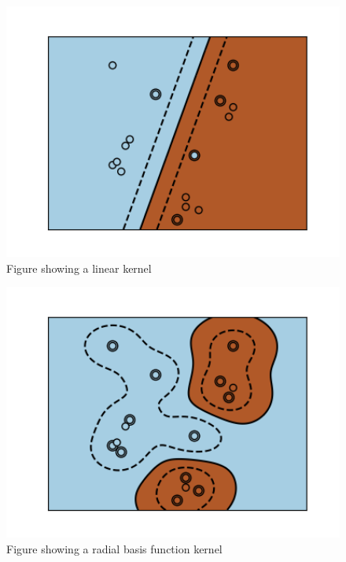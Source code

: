 \documentclass[11pt]{article}
\begin{document}
\begin{figure}[ht]
  \centering
  \includegraphics[width=12cm]{graphics/kernel_linear.png}
  \caption{Figure showing a linear kernel\cite{SVMKernelsScikitlearn24}}
\end{figure}

\begin{figure}[ht]
  \centering
  \includegraphics[width=12cm]{graphics/kernel_rbf.png}
  \caption{Figure showing a radial basis function kernel\cite{SVMKernelsScikitlearn24}}
\end{figure}
\end{document}
